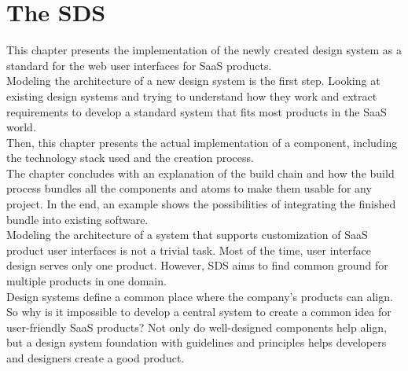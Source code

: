 \newpage

\section{The \acf{SDS}}\label{saas_design_system}
This chapter presents the implementation of the newly created design system as a standard for the web user interfaces for \ac{SaaS} products. \\
Modeling the architecture of a new design system is the first step. Looking at existing design systems and trying to understand how they work and extract requirements to develop a standard system that fits most products in the \ac{SaaS} world.  \\
Then, this chapter presents the actual implementation of a component, including the technology stack used and the creation process. \\
The chapter concludes with an explanation of the build chain and how the build process bundles all the components and atoms to make them usable for any project. In the end, an example shows the possibilities of integrating the finished bundle into existing software.\\
Modeling the architecture of a system that supports customization of \ac{SaaS} product user interfaces is not a trivial task. Most of the time, user interface design serves only one product. However, \ac{SDS} aims to find common ground for multiple products in one domain.  \\
Design systems define a common place where the company's products can align. So why is it impossible to develop a central system to create a common idea for user-friendly \ac{SaaS} products? Not only do well-designed components help align, but a design system foundation with guidelines and principles helps developers and designers create a good product. \\




